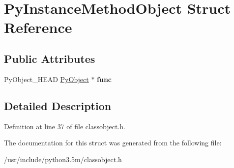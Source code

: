 \hypertarget{structPyInstanceMethodObject}{}\section{Py\+Instance\+Method\+Object Struct Reference}
\label{structPyInstanceMethodObject}
\subsection*{Public Attributes}
\begin{DoxyCompactItemize}
\item 
Py\+Object\+\_\+\+H\+E\+AD \hyperlink{struct__object}{Py\+Object} $\ast$ {\bfseries func}\hypertarget{structPyInstanceMethodObject_adf7c067109c539b7a744aa64aa61549b}{}\label{structPyInstanceMethodObject_adf7c067109c539b7a744aa64aa61549b}

\end{DoxyCompactItemize}


\subsection{Detailed Description}


Definition at line 37 of file classobject.\+h.



The documentation for this struct was generated from the following file\+:\begin{DoxyCompactItemize}
\item 
/usr/include/python3.\+5m/classobject.\+h\end{DoxyCompactItemize}
